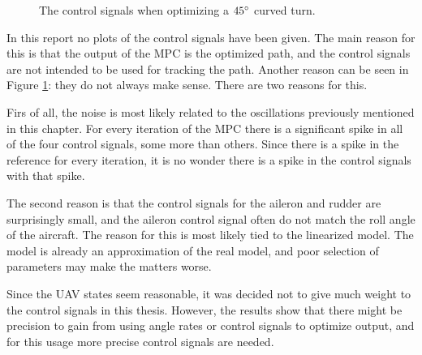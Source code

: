 \begin{figure}[]
	\centering
	\caption{The control signals when optimizing a $45\degree$ curved turn.}
	\label{fig:control_signals}
\end{figure}

In this report no plots of the control signals have been given. The main reason for this is that the output of the MPC is the optimized path, and the control signals are not intended to be used for tracking the path. Another reason can be seen in Figure \ref{fig:control_signals}: they do not always make sense. There are two reasons for this.

Firs of all, the noise is most likely related to the oscillations previously mentioned in this chapter. For every iteration of the MPC there is a significant spike in all of the four control signals, some more than others. Since there is a spike in the reference for every iteration, it is no wonder there is a spike in the control signals with that spike.

The second reason is that the control signals for the aileron and rudder are surprisingly small, and the aileron control signal often do not match the roll angle of the aircraft. The reason for this is most likely tied to the linearized model. The model is already an approximation of the real model, and poor selection of parameters may make the matters worse.

Since the UAV states seem reasonable, it was decided not to give much weight to the control signals in this thesis. However, the results show that there might be precision to gain from using angle rates or control signals to optimize output, and for this usage more precise control signals are needed.